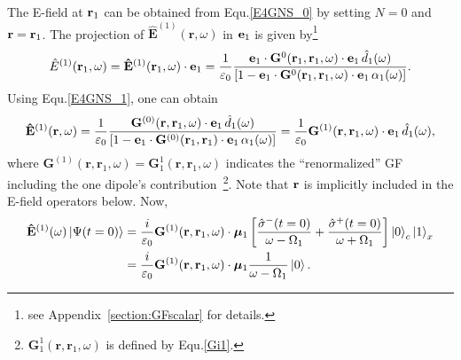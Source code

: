 The E-field at $\mathbf{r}_1$ can be obtained from Equ.\eqref{E4GNS_0} by setting $N=0$ and ${\bf r}= {\bf r}_1$. The projection of $\mathbf{\hat{E}}^{(1)}(\mathbf{r},\omega)$ in ${\bf e}_1$ is given by\footnote{see Appendix~\ref{section:GFscalar} for details.}
\begin{equation}\label{E1projection}
\hat{E}^{(1)}
(\mathbf{r}_1,\omega)=\mathbf{\hat{E}}^{(1)}(\mathbf{r}_1,\omega)\cdot{\bf e}_1=\frac{1}{\varepsilon_0}\frac{{\bf e}_1
\cdot\mathbf{G}^0(\mathbf{r}_1,\mathbf{r}_1,\omega)\cdot
\mathbf{e}_1 \, \hat{d}_1(\omega)}{[1-{\bf e}_1
\cdot\mathbf{G}^0(\mathbf{r}_1,\mathbf{r}_1,\omega)\cdot {\bf e}_1
\, \alpha_1(\omega)]}.
\end{equation}
Using Equ.\eqref{E4GNS_1}, one can obtain
\begin{equation}
\mathbf{\hat{E}}^{(1)}(\mathbf{r},\omega)=\frac{1}{\varepsilon_0}\frac{\mathbf{G}^{(0)}(\mathbf{r},\mathbf{r}_1,\omega)\cdot
\mathbf{e}_1 \, \hat d_1(\omega)}{[1-{\bf e}_1
\cdot\mathbf{G}^{(0)}(\mathbf{r}_1,\mathbf{r}_1)\cdot {\bf
e}_1\,\alpha_1(\omega)]}
=\frac{1}{\varepsilon_0}\mathbf{G}^{(1)}(\mathbf{r},\mathbf{r}_1,\omega)\cdot
{\bf e}_1 \, \hat{d}_1(\omega),
\end{equation}
where $\mathbf{G}^{(1)}(\mathbf{r},\mathbf{r}_1,\omega)=\mathbf{G}^{1}_1(\mathbf{r},\mathbf{r}_1,\omega)$ indicates the ``renormalized''
GF including the one dipole's contribution~\footnote{$\mathbf{G}^{1}_1(\mathbf{r},\mathbf{r}_1,\omega)$ is defined by Equ.\eqref{Gi1}.}. Note that $\mathbf{r}$ is implicitly included in the E-field operators below.
Now,
\begin{align}
\mathbf{\hat{E}}^{(1)}(\omega)\mathinner{|{\Psi(t=0)}\rangle}&=
\frac{i}{\varepsilon_0}\mathbf{G}^{(1)}(\mathbf{r},\mathbf{r}_1,\omega)\cdot
{\bm \mu_1} \left [
\frac{\hat{\sigma}^-(t=0)}{\omega-\Omega_1}+\frac{\hat{\sigma}^+(t=0)}
{\omega+\Omega_1}\right ] \mathinner{|{0}\rangle}_c\mathinner{|{1}\rangle}_x
\nonumber \\
&=\frac{i}{\varepsilon_0}\mathbf{G}^{(1)}(\mathbf{r},\mathbf{r}_1,\omega)\cdot
{\bm \mu_1}
\frac{1}{\omega-\Omega_1}\mathinner{|{0}\rangle}.
\end{align}
